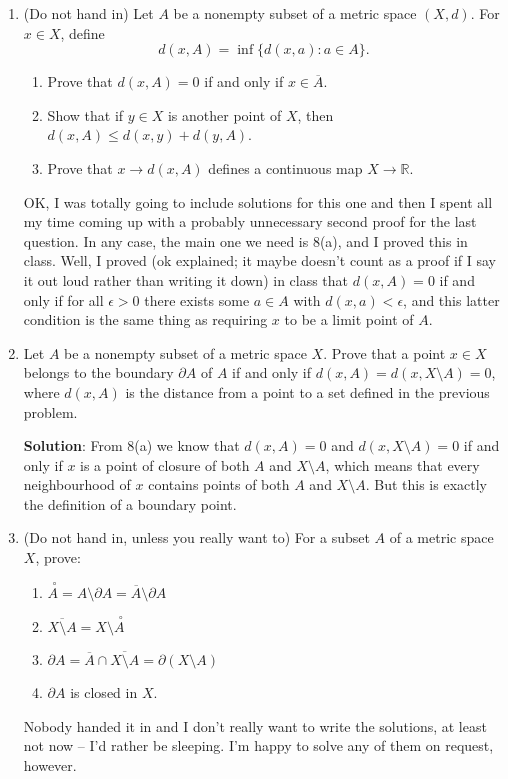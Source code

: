 \documentclass[letterpaper,12pt]{article}
\newcommand{\R}{\mathbb{R}}
\newcommand{\inter}[1]{\overset{\,\,\circ}{#1}}
\begin{document}
\begin{enumerate}
\item (Do not hand in) Let $A$ be a nonempty subset of a metric space $(X,d)$. For $x\in X$, define
\[
d(x,A) = \inf\{d(x,a):a\in A\}.
\]
\begin{enumerate}
\item Prove that $d(x,A)=0$ if and only if $x\in \overline{A}$.
\item Show that if $y\in X$ is another point of $X$, then $d(x,A)\leq d(x,y)+d(y,A)$.
\item Prove that $x\to d(x,A)$ defines a continuous map $X\to \R$.
\end{enumerate}

OK, I was totally going to include solutions for this one and then I spent all my time coming up with a probably unnecessary second proof for the last question. In any case, the main one we need is 8(a), and I proved this in class. Well, I proved (ok explained; it maybe doesn't count as a proof if I say it out loud rather than writing it down) in class that $d(x,A)=0$ if and only if for all $\epsilon>0$ there exists some $a\in A$ with $d(x,a)<\epsilon$, and this latter condition is the same thing as requiring $x$ to be a limit point of $A$.

\item Let $A$ be a nonempty subset of a metric space $X$. Prove that a point $x\in X$ belongs to the boundary $\partial A$ of $A$ if and only if $d(x,A) = d(x,X\setminus A)=0$, where $d(x,A)$ is the distance from a point to a set defined in the previous problem.

\bigskip

{\bf Solution}: From 8(a) we know that $d(x,A)=0$ and $d(x,X\setminus A)=0$ if and only if $x$ is a point of closure of both $A$ and $X\setminus A$, which means that every neighbourhood of $x$ contains points of both $A$ and $X\setminus A$. But this is exactly the definition of a boundary point.

\item (Do not hand in, unless you really want to) For a subset $A$ of a metric space $X$, prove:
\begin{enumerate}
\item $\inter{A} = A\setminus \partial A = \overline{A}\setminus \partial A$
\item $\overline{X\setminus A} = X\setminus \inter{A}$
\item $\partial A = \overline{A}\cap \overline{X\setminus A} = \partial (X\setminus A)$
\item $\partial A$ is closed in $X$.
\end{enumerate}
Nobody handed it in and I don't really want to write the solutions, at least not now -- I'd rather be sleeping. I'm happy to solve any of them on request, however.
\end{enumerate}
\end{document}

